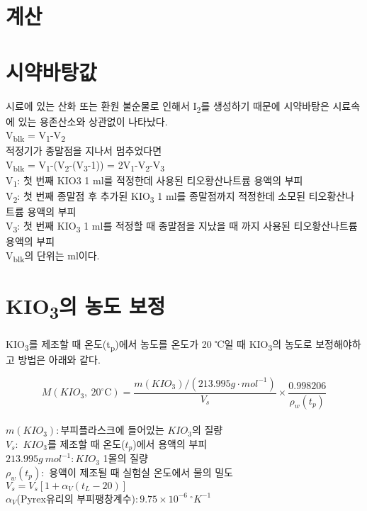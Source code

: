\documentclass[
]{book}
\begin{document}
\hypertarget{uxacc4uxc0b0}{%
\section{계산}\label{uxacc4uxc0b0}}

\hypertarget{uxc2dcuxc57duxbc14uxd0d5uxac12}{%
\section{시약바탕값}\label{uxc2dcuxc57duxbc14uxd0d5uxac12}}

시료에 있는 산화 또는 환원 불순물로 인해서 I\textsubscript{2}를 생성하기 때문에 시약바탕은 시료속에 있는 용존산소와 상관없이 나타났다.\\
V\textsubscript{blk} = V\textsubscript{1}-V\textsubscript{2}\\
적정기가 종말점을 지나서 멈추었다면\\
V\textsubscript{blk} = V\textsubscript{1}-(V\textsubscript{2}-(V\textsubscript{3}-1)) = 2V\textsubscript{1}-V\textsubscript{2}-V\textsubscript{3}\\
V\textsubscript{1}: 첫 번째 KIO3 1 ml를 적정한데 사용된 티오황산나트륨 용액의 부피\\
V\textsubscript{2}: 첫 번째 종말점 후 추가된 KIO\textsubscript{3} 1 ml를 종말점까지 적정한데 소모된 티오황산나트륨 용액의 부피\\
V\textsubscript{3}: 첫 번째 KIO\textsubscript{3} 1 ml를 적정할 때 종말점을 지났을 때 까지 사용된 티오황산나트륨 용액의 부피\\
V\textsubscript{blk}의 단위는 ml이다.

\hypertarget{kio3uxc758-uxb18duxb3c4-uxbcf4uxc815}{%
\section{\texorpdfstring{KIO\textsubscript{3}의 농도 보정}{KIO3의 농도 보정}}\label{kio3uxc758-uxb18duxb3c4-uxbcf4uxc815}}

KIO\textsubscript{3}를 제조할 때 온도(t\textsubscript{p})에서 농도를 온도가 20 ℃일 때 KIO\textsubscript{3}의 농도로 보정해야하고 방법은 아래와 같다.

\[M(KIO_{3}, ~ 20^{\circ} \mathrm C)= \frac {m(KIO_{3})/(213.995g \cdot mol^{-1})}{V_{s}} \times \frac{0.998206}{\rho _{w} (t_{p})}\]\\
\(m(KIO_{3}):\)부피플라스크에 들어있는 \(KIO_3\)의 질량\\
\(V_{s}:\) \(KIO_3\)를 제조할 때 온도(\(t_{p}\))에서 용액의 부피\\
\(213.995g~mol^{-1} : KIO_3\) 1몰의 질량\\
\(\rho_{w} (t_{p}):\) 용액이 제조될 때 실험실 온도에서 물의 밀도\\
\(V_{s} = V_{s}[1+\alpha_{V} (t_{L} -20)]\)\\
\(\alpha_{V}\)(Pyrex유리의 부피팽창계수)\(: 9.75 \times 10^{-6} ~^{\circ} K^{-1}\)
\end{document}
